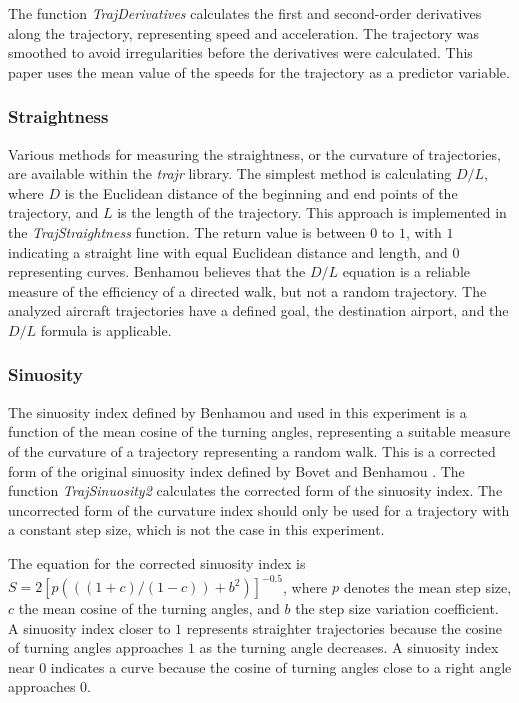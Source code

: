 \let\LaTeXcline\cline\documentclass[sn-mathphys-num]{sn-jnl}\let\cline\LaTeXcline
\begin{document}
The function \textit{TrajDerivatives} calculates the first and second-order derivatives along the trajectory, representing speed and acceleration. The trajectory was smoothed to avoid irregularities before the derivatives were calculated. This paper uses the mean value of the speeds for the trajectory as a predictor variable.

\subsubsection{Straightness}
 
Various methods for measuring the straightness, or the curvature of trajectories, are available within the \textit{trajr} library. The simplest method is calculating $D/L$, where $D$ is the Euclidean distance of the beginning and end points of the trajectory, and $L$ is the length of the trajectory. This approach is implemented in the \textit{TrajStraightness} function. The return value is between $0$ to $1$, with $1$ indicating a straight line with equal Euclidean distance and length, and $0$ representing curves. Benhamou \cite{Benhamou2004} believes that the $D/L$ equation is a reliable measure of the efficiency of a directed walk, but not a random trajectory. The analyzed aircraft trajectories have a defined goal, the destination airport, and the $D/L$ formula is applicable.
 
\subsubsection{Sinuosity}

The sinuosity index defined by Benhamou \cite{Benhamou2004} and used in this experiment is a function of the mean cosine of the turning angles, representing a suitable measure of the curvature of a trajectory representing a random walk. This is a corrected form of the original sinuosity index defined by Bovet and Benhamou \cite{Bovet1988}. The function \textit{TrajSinuosity2} calculates the corrected form of the sinuosity index. The uncorrected form of the curvature index should only be used for a trajectory with a constant step size, which is not the case in this experiment.

The equation for the corrected sinuosity index is $S = 2 {[p(((1+c)/(1-c))+b^{2})]}^{-0.5}$, where $p$ denotes the mean step size, $c$ the mean cosine of the turning angles, and $b$ the step size variation coefficient. A sinuosity index closer to $1$ represents straighter trajectories because the cosine of turning angles approaches $1$ as the turning angle decreases. A sinuosity index near $0$ indicates a curve because the cosine of turning angles close to a right angle approaches $0$.
\end{document}
